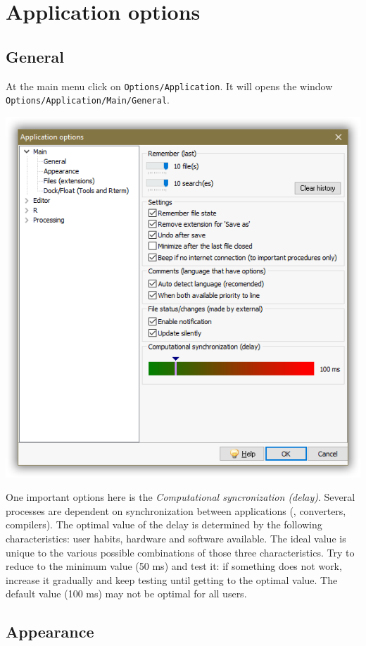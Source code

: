 
\section{Application options}
\subsection{General}

At the main menu click on \texttt{Options/Application}.
It will opens the window \texttt{Options/Application/Main/General}.

\includegraphics[scale=0.50]{./res/app_main_general.png}

One important options here is the \textit{Computational syncronization (delay)}.
Several processes are dependent on synchronization between applications
(\RR{}, converters, compilers). The optimal value of the delay is determined by the following characteristics:
user habits, hardware and software available.
The ideal value is unique to the various possible combinations of those three characteristics.
Try to reduce to the minimum value (50 ms) and test it: if something does not work, increase it gradually
and keep testing until getting to the optimal value. The default value (100 ms) may not be optimal for all users.


\subsection{Appearance}

